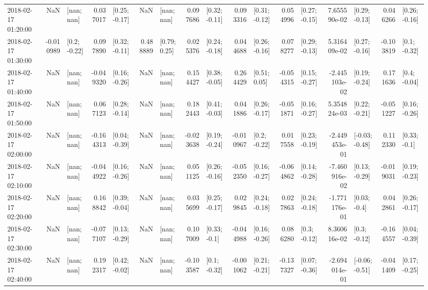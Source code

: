 \begin{tabular}{lrlrlrlrlrlrlrlrl}
2018-02-17 01:20:00 &       NaN &      [nan; nan] &  0.037017 &   [0.25; -0.17] &       NaN &      [nan; nan] &  0.097686 &   [0.32; -0.11] &  0.093316 &   [0.31; -0.12] &  0.054996 &   [0.27; -0.15] &  7.655590e-02 &   [0.29; -0.13] &  0.046266 &   [0.26; -0.16] \\
2018-02-17 01:30:00 & -0.010989 &    [0.2; -0.22] &  0.097890 &   [0.32; -0.11] &  0.488889 &    [0.79; 0.25] &  0.025376 &   [0.24; -0.18] &  0.044688 &   [0.26; -0.16] &  0.078277 &   [0.29; -0.13] &  5.316409e-02 &   [0.27; -0.16] & -0.103819 &    [0.1; -0.32] \\
2018-02-17 01:40:00 &       NaN &      [nan; nan] & -0.049320 &   [0.16; -0.26] &       NaN &      [nan; nan] &  0.154427 &   [0.38; -0.05] &  0.264429 &    [0.51; 0.05] & -0.054315 &   [0.15; -0.27] & -2.445103e-02 &   [0.19; -0.24] &  0.171636 &    [0.4; -0.04] \\
2018-02-17 01:50:00 &       NaN &      [nan; nan] &  0.067123 &   [0.28; -0.14] &       NaN &      [nan; nan] &  0.182443 &   [0.41; -0.03] &  0.041886 &   [0.26; -0.17] & -0.051871 &   [0.16; -0.27] &  5.354824e-03 &   [0.22; -0.21] & -0.051227 &   [0.16; -0.26] \\
2018-02-17 02:00:00 &       NaN &      [nan; nan] & -0.164313 &   [0.04; -0.39] &       NaN &      [nan; nan] & -0.023638 &   [0.19; -0.24] & -0.010967 &    [0.2; -0.22] &  0.017558 &   [0.23; -0.19] & -2.449453e-01 &  [-0.03; -0.48] &  0.112330 &    [0.33; -0.1] \\
2018-02-17 02:10:00 &       NaN &      [nan; nan] & -0.044922 &   [0.16; -0.26] &       NaN &      [nan; nan] &  0.051125 &   [0.26; -0.16] & -0.052350 &   [0.16; -0.27] & -0.064862 &   [0.14; -0.28] & -7.460916e-02 &   [0.13; -0.29] & -0.019031 &   [0.19; -0.23] \\
2018-02-17 02:20:00 &       NaN &      [nan; nan] &  0.168842 &   [0.39; -0.04] &       NaN &      [nan; nan] &  0.035699 &   [0.25; -0.17] &  0.029845 &   [0.24; -0.18] &  0.027863 &   [0.24; -0.18] & -1.771176e-01 &    [0.03; -0.4] &  0.042861 &   [0.26; -0.17] \\
2018-02-17 02:30:00 &       NaN &      [nan; nan] & -0.077107 &   [0.13; -0.29] &       NaN &      [nan; nan] &  0.107009 &    [0.33; -0.1] & -0.044988 &   [0.16; -0.26] &  0.086280 &    [0.3; -0.12] &  8.360616e-02 &    [0.3; -0.12] & -0.164557 &   [0.04; -0.39] \\
2018-02-17 02:40:00 &       NaN &      [nan; nan] &  0.192317 &   [0.42; -0.02] &       NaN &      [nan; nan] & -0.103587 &    [0.1; -0.32] & -0.001062 &   [0.21; -0.21] & -0.137327 &   [0.07; -0.36] & -2.694014e-01 &  [-0.06; -0.51] & -0.041409 &   [0.17; -0.25] \\

\end{tabular}
